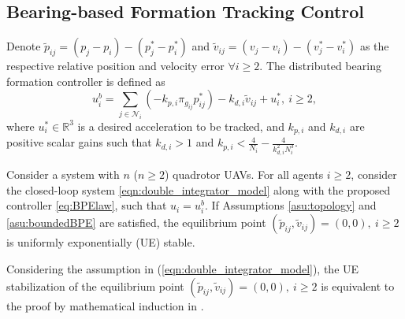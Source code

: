\subsection{Bearing-based Formation Tracking Control} \label{sec:BPEcontrol}
Denote $\tilde{p}_{ij} = (p_{j} - p_{i}) - (p_{j}^* - p_{i}^*)$ and $\tilde{v}_{ij} = (v_{j} - v_{i}) - (v_{j}^* - v_{i}^*)$ as the respective relative position and velocity error $\forall i\ge 2$. The distributed bearing formation controller is defined as
\begin{equation}
    u_i^{b} = \sum_{j \in \mathcal{N}_i}( -{k_{p,i}} \pi_{g_{ij}} p_{ij}^*) - {k_{d,i}} \tilde{v}_{ij} + u_i^*, \ i\ge 2,
    \label{eq:BPElaw}
\end{equation}
where $u_i^{*} \in \mathbb{R}^{3}$ is a desired acceleration to be tracked, and $k_{p,i}$ and $k_{d,i}$ are positive scalar gains such that $k_{d,i} > 1$ and $k_{p,i} < \frac{4}{N_i} - \frac{4}{k_{d,i}^2 N_i^3}$.
\begin{theorem} \label{th:formation}
Consider a system with $n$ ($n\geq2$) quadrotor UAVs. For all agents $i\ge 2$, consider the closed-loop system \eqref{eqn:double_integrator_model} along with the proposed controller \eqref{eq:BPElaw}, such that $u_i = u_i^b$. If Assumptions \ref{asu:topology} and \ref{asu:boundedBPE} are satisfied, the equilibrium point $(\tilde{p}_{ij},\tilde{v}_{ij})=(0,0), \ i \ge 2$ is uniformly exponentially (UE) stable.
\end{theorem}
Considering the assumption in (\ref{eqn:double_integrator_model}), the UE stabilization of the equilibrium point $(\tilde{p}_{ij},\tilde{v}_{ij})=(0,0), \ i \ge 2$ is equivalent to the proof by mathematical induction in \cite[Theorem 2]{tang2021formation}. 

